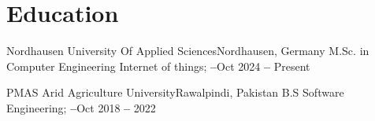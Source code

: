 


\section{Education}
\vspace{3pt}
\resumeSubHeadingListStart

\resumeEducationHeading
{Nordhausen University Of Applied Sciences}{Nordhausen, Germany}
{M.Sc. in Computer Engineering Internet of things;   \textbf{--}}{Oct 2024 \textbf{--} Present}

\resumeEducationHeading
{PMAS Arid Agriculture University}{Rawalpindi, Pakistan}
{B.S Software Engineering;   \textbf{--}}{Oct 2018 \textbf{--} 2022}







\resumeSubHeadingListEnd